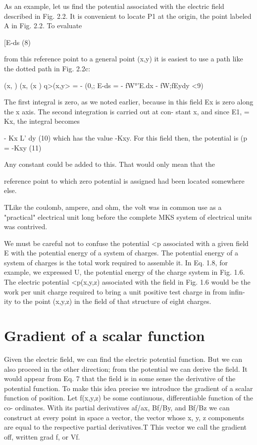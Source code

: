 As an example, let us find the potential associated with the electric
field described in Fig. 2.2. It is convenient to locate P1 at the origin,
the point labeled A in Fig. 2.2. To evaluate

[E-ds (8)

from this reference point to a general point (x,y) it is easiest to use
a path like the dotted path in Fig. 2.2c:

(x, ) (x, (x )
q>(x,y> = - (0,; E-ds = - fW°'E.dx - fW;fEydy <9)

The first integral is zero, as we noted earlier, because in this field Ex
is zero along the x axis. The second integration is carried out at con-
stant x, and since E1, = Kx, the integral becomes

- Kx L' dy (10)
which has the value -Kxy. For this field then, the potential is
(p = -Kxy (11)

Any constant could be added to this. That would only mean that the

reference point to which zero potential is assigned had been located
somewhere else.

TLike the coulomb, ampere, and ohm, the volt was in common use as a "practical"
electrical unit long before the complete MKS system of electrical units was contrived.

We must be careful not to confuse the potential <p associated with
a given field E with the potential energy of a system of charges. The
potential energy of a system of charges is the total work required to
assemble it. In Eq. 1.8, for example, we expressed U, the potential
energy of the charge system in Fig. 1.6. The electric potential
<p(x,y,z) associated with the field in Fig. 1.6 would be the work per
unit charge required to bring a unit positive test charge in from infin-
ity to the point (x,y,z) in the field of that structure of eight charges.

\section{Gradient of a scalar function}

Given the electric field, we can find the electric potential function.
But we can also proceed in the other direction; from the potential we
can derive the field. It would appear from Eq. 7 that the field is in
some sense the derivative of the potential function. To make this idea
precise we introduce the gradient of a scalar function of position.
Let f(x,y,z) be some continuous, differentiable function of the co-
ordinates. With its partial derivatives af/ax, Bf/By, and Bf/Bz we
can construct at every point in space a vector, the vector whose x, y, z
components are equal to the respective partial derivatives.T This
vector we call the gradient off, written grad f, or Vf.

